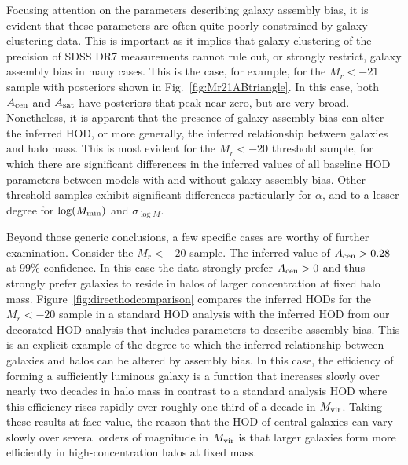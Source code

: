 \documentclass[usenatbib,usegraphicx,letterpaper]{mn2e}
\newcommand{\mvir}{M_{\rm vir}}
\begin{document}
Focusing attention on the parameters describing galaxy assembly bias, it is
evident that these parameters are often quite poorly constrained by galaxy
clustering data. This is important as it implies that galaxy clustering of the precision
of SDSS DR7 measurements cannot rule out, or strongly restrict, galaxy assembly
bias in many cases. This is the case, for example, for the $M_r<-21$ sample with posteriors
shown in Fig.~\ref{fig:Mr21ABtriangle}. In this case, both $A_{\rm cen}$ and
$A_{\rm sat}$ have posteriors that peak near zero, but are very broad.
Nonetheless, it is apparent that the presence of galaxy assembly bias
can alter the inferred HOD, or more generally, the inferred relationship between
galaxies and halo mass. This is most evident for the $M_r < -20$ threshold sample,
for which there are significant differences in the inferred values of all baseline HOD
parameters between models with and without galaxy assembly bias. Other threshold
samples exhibit significant differences particularly for $\alpha$, and to a lesser degree
for $\log (M_{\rm min})$ and $\sigma_{\log M}$.


Beyond those generic conclusions, a few specific cases are worthy of further examination.
Consider the $M_r < -20$ sample. The inferred value of $A_{\rm cen} > 0.28$ at 99\%
confidence. In this case the data strongly prefer $A_{\rm cen} > 0$ and thus strongly prefer
galaxies to reside in halos of larger concentration at fixed halo mass. Figure~\ref{fig:directhodcomparison}
compares the inferred HODs for the $M_r<-20$ sample in a standard HOD analysis with the
inferred HOD from our decorated HOD analysis that includes parameters to describe
assembly bias. This is an explicit example of the degree to which the inferred relationship
between galaxies and halos can be altered by assembly bias. In this case, the efficiency 
of forming a sufficiently luminous galaxy is a function that increases slowly over nearly two 
decades in halo mass in contrast to a standard analysis HOD where this efficiency rises 
rapidly over roughly one third of a decade in $\mvir$. Taking these results at face value, 
the reason that the HOD of central galaxies can vary slowly over several orders of magnitude 
in $\mvir$ is that larger galaxies form more efficiently in high-concentration halos at fixed 
mass. 
\end{document}
